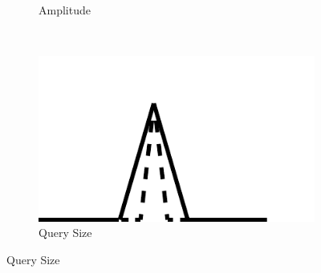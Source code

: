 {\begin{figure}
\begin{subfigure}{.45\columnwidth}
 		\caption{Amplitude}
 	\end{subfigure}
 	~
 	\begin{subfigure}{.45\columnwidth}
 		\includegraphics[width=\textwidth]{./figures/invariants/size}
 		\caption{Query Size}
 	\end{subfigure}
 	

\end{figure}}
